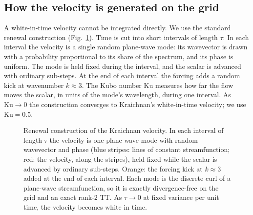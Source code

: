 \documentclass[aps,prfluids,reprint,onecolumn,amsmath,amssymb,nofootinbib,floatfix]{revtex4-2}
\begin{document}
\subsection{How the velocity is generated on the grid}

A white-in-time velocity cannot be integrated directly. We use the standard
renewal construction (Fig.~\ref{fig:kraichnan}). Time is cut into short intervals
of length $\tau$. In each interval the velocity is a single random plane-wave
mode: its wavevector is drawn with a probability proportional to its share of the
spectrum, and its phase is uniform. The mode is held fixed during the interval,
and the scalar is advanced with ordinary sub-steps. At the end of each interval
the forcing adds a random kick at wavenumber $k\approx3$. The Kubo number
$\mathrm{Ku}$ measures how far the flow moves the scalar, in units of the mode's
wavelength, during one interval. As $\mathrm{Ku}\to0$ the construction converges
to Kraichnan's white-in-time velocity; we use $\mathrm{Ku}=0.5$.

\begin{figure}[t]
\centering
{}
\caption{Renewal construction of the Kraichnan velocity. In each interval of
length $\tau$ the velocity is one plane-wave mode with random wavevector and
phase (blue stripes: lines of constant streamfunction; red: the velocity, along
the stripes), held fixed while the scalar is advanced by ordinary sub-steps.
Orange: the forcing kick at $k\approx3$ added at the end of each interval. Each mode
is the discrete curl of a plane-wave streamfunction, so it is exactly
divergence-free on the grid and an exact rank-2 TT. As $\tau\to0$ at fixed variance per unit time,
the velocity becomes white in time.}
\label{fig:kraichnan}
\end{figure}
\end{document}

